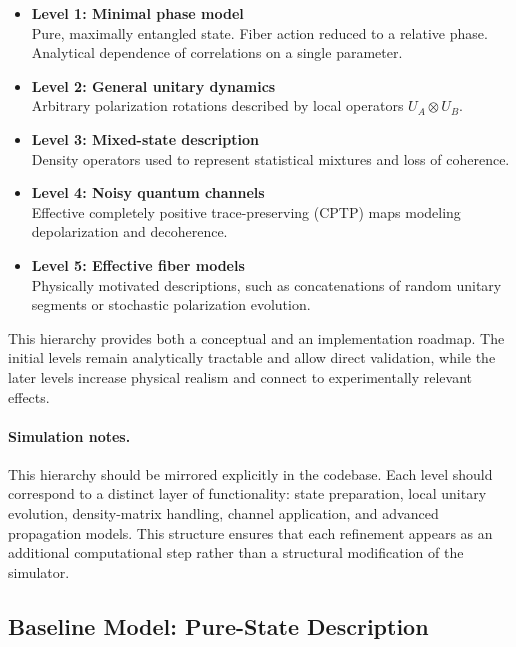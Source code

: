\documentclass[a4paper]{article}
\begin{document}
\begin{itemize}
    \item \textbf{Level 1: Minimal phase model} \\
    Pure, maximally entangled state. Fiber action reduced to a relative phase. Analytical dependence of correlations on a single parameter.

    \item \textbf{Level 2: General unitary dynamics} \\
    Arbitrary polarization rotations described by local operators \(U_A \otimes U_B\).

    \item \textbf{Level 3: Mixed-state description} \\
    Density operators used to represent statistical mixtures and loss of coherence.

    \item \textbf{Level 4: Noisy quantum channels} \\
    Effective completely positive trace-preserving (CPTP) maps modeling depolarization and decoherence.

    \item \textbf{Level 5: Effective fiber models} \\
    Physically motivated descriptions, such as concatenations of random unitary segments or stochastic polarization evolution.
\end{itemize}

This hierarchy provides both a conceptual and an implementation roadmap. The initial levels remain analytically tractable and allow direct validation, while the later levels increase physical realism and connect to experimentally relevant effects.

\paragraph{Simulation notes.}
This hierarchy should be mirrored explicitly in the codebase. Each level should correspond to a distinct layer of functionality: state preparation, local unitary evolution, density-matrix handling, channel application, and advanced propagation models. This structure ensures that each refinement appears as an additional computational step rather than a structural modification of the simulator.


\subsection{Baseline Model: Pure-State Description}
\end{document}
